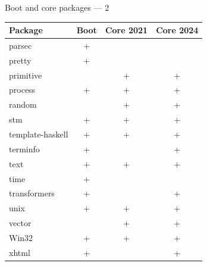 \documentclass[handout]{beamer}
\begin{document}
\begin{frame}{Boot and core packages --- 2}

\begin{table}[c]
\begin{tabular}{lccc}
Package          & Boot & Core 2021 & Core 2024 \\
\hline
parsec           & \cellcolor{red}+    &           &           \\
pretty           & \cellcolor{red}+    &           &           \\
primitive        &      & +         & +         \\
process          & +    & +         & +         \\
random           &      & +         & +         \\
stm              & +    & +         & +         \\
template-haskell & +    & +         & +         \\
terminfo         & +    &           & \cellcolor{green}+         \\
text             & +    & +         & +         \\
time             & \cellcolor{red}+    &           &           \\
transformers     & +    &           & \cellcolor{green}+         \\
unix             & +    & +         & +         \\
vector           &      & +         & +         \\
Win32            & +    & +         & +         \\
xhtml            & +    &           & \cellcolor{green}+         \\
\end{tabular}
\end{table}

\end{frame}
\end{document}
